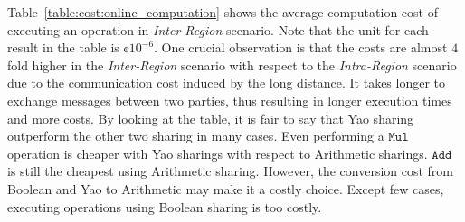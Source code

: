 \documentclass{llncs}
\begin{document}
Table~\ref{table:cost:online_computation} shows the average computation cost of executing an operation in \emph{Inter-Region} scenario. Note that the unit for each result in the table is $\cent10^{-6}$. One crucial observation is that the costs are almost $4$ fold higher in the \emph{Inter-Region} scenario with respect to the \emph{Intra-Region} scenario due to the communication cost induced by the long distance. It takes longer to exchange messages between two parties, thus resulting in longer execution times and more costs. By looking at the table, it is fair to say that Yao sharing outperform the other two sharing in many cases. Even performing a $\mathtt{Mul}$ operation is cheaper with Yao sharings with respect to Arithmetic sharings. $\mathtt{Add}$ is still the cheapest using Arithmetic sharing. However, the conversion cost from Boolean and Yao to Arithmetic may make it a costly choice. Except few cases, executing operations using Boolean sharing is too costly. 
\end{document}

